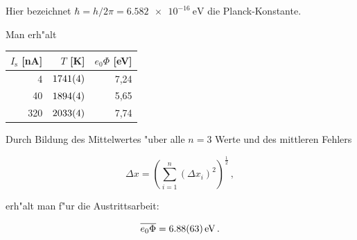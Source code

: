 		Hier bezeichnet $\hbar = h / 2\pi = \SI{6.582e-16}{\electronvolt}$ \cite{nist} die Planck-Konstante.

		Man erh"alt

		\begin{table}[h!]
			\begin{center}
				\label{messung1}
				\begin{tabular}{|r|r|r|}
					\hline
						$I_\mathrm{s}$ [nA] & $T$ [K] & $e_0 \Phi$ [eV] \\
					\hline 
					\hline
						4 & $\SI{1741 (4)}{}$ & 7,24\\
						40 & $\SI{1894 (4)}{}$ & 5,65 \\
						320 & $\SI{2033 (4)}{}$ & 7,74 \\
					\hline 
				\end{tabular}
			\end{center}
		\end{table}

		\clearpage

		Durch Bildung des Mittelwertes "uber alle $n = 3$ Werte und des mittleren Fehlers

		\begin{equation*}
			\Delta x = \left(\sum_{i=1}^{n} (\Delta x_i)^2\right)^{\frac{1}{2}}\,,
		\end{equation*}

		erh"alt man f"ur die Austrittsarbeit:

		\begin{eqnarray*}
			\overline{e_0 \Phi} = \SI{6.88 (63)}{\electronvolt}\,.
		\end{eqnarray*}


